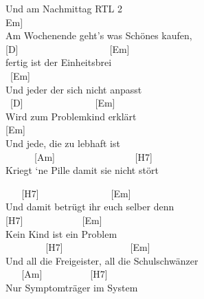 \documentclass[
  letterpaper,
  twoside=false]{scrbook}
\begin{document}
Und am Nachmittag RTL 2\\
\hspace*{0.333em}{[}Em{]}\\
Am Wochenende geht's was Schönes kaufen,\\
{[}D{]} ~ ~ ~ ~ ~ ~ ~ ~ ~ ~ ~ {[}Em{]}\\
fertig ist der Einheitsbrei\\
\hspace*{0.333em} ~{[}Em{]}\\
Und jeder der sich nicht anpasst\\
\hspace*{0.333em} ~{[}D{]} ~ ~ ~ ~ ~ ~ ~ ~ ~{[}Em{]}\\
Wird zum Problemkind erklärt\\
\hspace*{0.333em} {[}Em{]}\\
Und jede, die zu lebhaft ist\\
\hspace*{0.333em} ~ ~ ~ ~{[}Am{]} ~ ~ ~ ~ ~ ~ ~ ~ ~ ~{[}H7{]}\\
Kriegt `ne Pille damit sie nicht stört

~ ~ {[}H7{]} ~ ~ ~ ~ ~ ~ ~ ~ ~{[}Em{]}\\
Und damit betrügt ihr euch selber denn\\
{[}H7{]} ~ ~ ~ ~ ~ ~ ~ {[}Em{]}\\
Kein Kind ist ein Problem\\
\hspace*{0.333em} ~ ~ ~ ~ ~ {[}H7{]} ~ ~ ~ ~ ~ ~ ~ ~ {[}Em{]}\\
Und all die Freigeister, all die Schulschwänzer\\
\hspace*{0.333em} ~ ~ {[}Am{]} ~ ~ ~ ~ ~ ~{[}H7{]}\\
Nur Symptomträger im System
\end{document}
